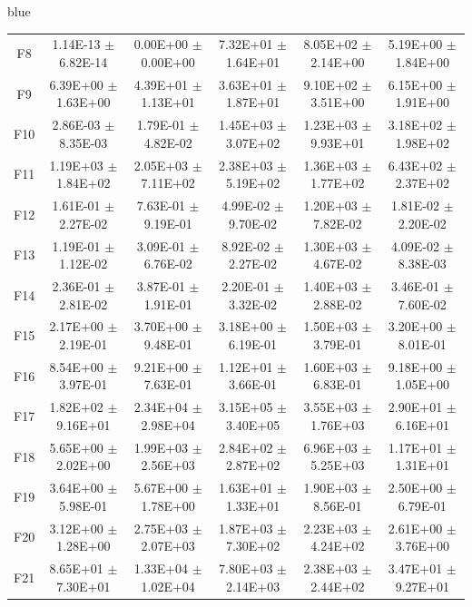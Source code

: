 \documentclass[journal, onecolumn]{IEEEtran}
\begin{document}
\begin{color}{blue}
\begin{table}[htbp!]
\begin{tabular}{c|ccccc}
		F8	 &	1.14E-13	$\pm$	6.82E-14		 &	0.00E+00	$\pm$	0.00E+00		 &	7.32E+01	$\pm$	1.64E+01		 &	8.05E+02	$\pm$	2.14E+00		 &	5.19E+00	$\pm$	1.84E+00	\\	
		F9	 &	6.39E+00	$\pm$	1.63E+00		 &	4.39E+01	$\pm$	1.13E+01		 &	3.63E+01	$\pm$	1.87E+01		 &	9.10E+02	$\pm$	3.51E+00		 &	6.15E+00	$\pm$	1.91E+00	\\	
		F10	 &	2.86E-03	$\pm$	8.35E-03		 &	1.79E-01	$\pm$	4.82E-02		 &	1.45E+03	$\pm$	3.07E+02		 &	1.23E+03	$\pm$	9.93E+01		 &	3.18E+02	$\pm$	1.98E+02	\\	
		F11	 &	1.19E+03	$\pm$	1.84E+02		 &	2.05E+03	$\pm$	7.11E+02		 &	2.38E+03	$\pm$	5.19E+02		 &	1.36E+03	$\pm$	1.77E+02		 &	6.43E+02	$\pm$	2.37E+02	\\	
		F12	 &	1.61E-01	$\pm$	2.27E-02		 &	7.63E-01	$\pm$	9.19E-01		 &	4.99E-02	$\pm$	9.70E-02		 &	1.20E+03	$\pm$	7.82E-02		 &	1.81E-02	$\pm$	2.20E-02	\\	
		F13	 &	1.19E-01	$\pm$	1.12E-02		 &	3.09E-01	$\pm$	6.76E-02		 &	8.92E-02	$\pm$	2.27E-02		 &	1.30E+03	$\pm$	4.67E-02		 &	4.09E-02	$\pm$	8.38E-03	\\	
		F14	 &	2.36E-01	$\pm$	2.81E-02		 &	3.87E-01	$\pm$	1.91E-01		 &	2.20E-01	$\pm$	3.32E-02		 &	1.40E+03	$\pm$	2.88E-02		 &	3.46E-01	$\pm$	7.60E-02	\\	
		F15	 &	2.17E+00	$\pm$	2.19E-01		 &	3.70E+00	$\pm$	9.48E-01		 &	3.18E+00	$\pm$	6.19E-01		 &	1.50E+03	$\pm$	3.79E-01		 &	3.20E+00	$\pm$	8.01E-01	\\	
		F16	 &	8.54E+00	$\pm$	3.97E-01		 &	9.21E+00	$\pm$	7.63E-01		 &	1.12E+01	$\pm$	3.66E-01		 &	1.60E+03	$\pm$	6.83E-01		 &	9.18E+00	$\pm$	1.05E+00	\\	
		F17	 &	1.82E+02	$\pm$	9.16E+01		 &	2.34E+04	$\pm$	2.98E+04		 &	3.15E+05	$\pm$	3.40E+05		 &	3.55E+03	$\pm$	1.76E+03		 &	2.90E+01	$\pm$	6.16E+01	\\	
		F18	 &	5.65E+00	$\pm$	2.02E+00		 &	1.99E+03	$\pm$	2.56E+03		 &	2.84E+02	$\pm$	2.87E+02		 &	6.96E+03	$\pm$	5.25E+03		 &	1.17E+01	$\pm$	1.31E+01	\\	
		F19	 &	3.64E+00	$\pm$	5.98E-01		 &	5.67E+00	$\pm$	1.78E+00		 &	1.63E+01	$\pm$	1.33E+01		 &	1.90E+03	$\pm$	8.56E-01		 &	2.50E+00	$\pm$	6.79E-01	\\	
		F20	 &	3.12E+00	$\pm$	1.28E+00		 &	2.75E+03	$\pm$	2.07E+03		 &	1.87E+03	$\pm$	7.30E+02		 &	2.23E+03	$\pm$	4.24E+02		 &	2.61E+00	$\pm$	3.76E+00	\\	
		F21	 &	8.65E+01	$\pm$	7.30E+01		 &	1.33E+04	$\pm$	1.02E+04		 &	7.80E+03	$\pm$	2.14E+03		 &	2.38E+03	$\pm$	2.44E+02		 &	3.47E+01	$\pm$	9.27E+01	\\	

\end{tabular}
\end{table}
\end{color}
\end{document}
